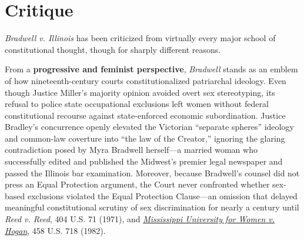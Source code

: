 \documentclass[12pt]{article}
\begin{document}
\section{Critique}

\textit{Bradwell v. Illinois} has been criticized from virtually every major school of constitutional thought, though for sharply different reasons.

From a \textbf{progressive and feminist perspective}, \textit{Bradwell} stands as an emblem of how nineteenth-century courts constitutionalized patriarchal ideology. Even though Justice Miller's majority opinion avoided overt sex stereotyping, its refusal to police state occupational exclusions left women without federal constitutional recourse against state-enforced economic subordination. Justice Bradley's concurrence openly elevated the Victorian ``separate spheres'' ideology and common-law coverture into ``the law of the Creator,'' ignoring the glaring contradiction posed by Myra Bradwell herself---a married woman who successfully edited and published the Midwest's premier legal newspaper and passed the Illinois bar examination. Moreover, because Bradwell's counsel did not press an Equal Protection argument, the Court never confronted whether sex-based exclusions violated the Equal Protection Clause---an omission that delayed meaningful constitutional scrutiny of sex discrimination for nearly a century until \textit{Reed v. Reed}, 404 U.S. 71 (1971), and \href{https://supreme.justia.com/cases/federal/us/458/718/}{\textit{Mississippi University for Women v. Hogan}}, 458 U.S. 718 (1982).
\end{document}
